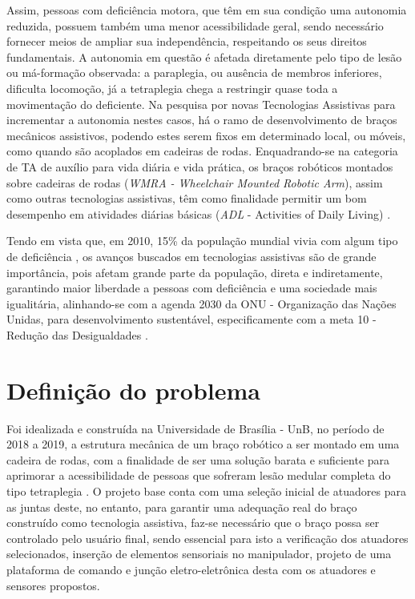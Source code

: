 Assim, pessoas com deficiência motora, que têm em sua condição uma autonomia reduzida, possuem também uma menor acessibilidade geral, sendo necessário fornecer
meios de ampliar sua independência, respeitando os seus direitos fundamentais. A autonomia em questão é afetada diretamente pelo tipo de lesão ou 
má-formação observada: a paraplegia, ou ausência de membros inferiores, dificulta  locomoção, já a tetraplegia chega a restringir quase toda a movimentação do deficiente.
Na pesquisa por novas Tecnologias Assistivas para incrementar a autonomia nestes casos, há o ramo de desenvolvimento de braços mecânicos assistivos, podendo 
estes serem fixos em determinado local, ou móveis, como quando são acoplados em cadeiras de rodas. Enquadrando-se na categoria de TA de auxílio para vida
diária e vida prática, os braços robóticos montados sobre cadeiras de rodas (\textit{WMRA - Wheelchair Mounted Robotic Arm}), assim como outras tecnologias 
assistivas, têm como finalidade permitir um bom desempenho em atividades diárias básicas (\textit{ADL} - Activities of Daily Living) \cite{capille2010kinematic}. 

Tendo em vista que, em 2010, 15\% da população mundial vivia com algum tipo de deficiência \cite{world2011world}, os avanços buscados em tecnologias 
assistivas são de grande importância, pois afetam grande parte da população, direta e indiretamente, 
garantindo maior liberdade a pessoas com deficiência e uma sociedade
mais igualitária, alinhando-se com a agenda 2030 da ONU - Organização das Nações Unidas,
para desenvolvimento sustentável, especificamente com a meta 10 - Redução das Desigualdades \cite{un2030agenda}.

\section{Definição do problema}

Foi idealizada e construída na Universidade de Brasília - UnB, no período de 2018 a 2019, 
a estrutura mecânica de um braço robótico a ser montado em uma cadeira de rodas, com a finalidade de ser
uma solução barata e suficiente para aprimorar a acessibilidade de pessoas que sofreram lesão medular completa do tipo tetraplegia \cite{fernando2019assistivo}. 
O projeto base conta com uma seleção inicial de atuadores para as juntas deste, no entanto, para garantir uma adequação real do braço construído como 
tecnologia assistiva, faz-se necessário que o braço possa ser controlado pelo usuário final, sendo essencial para isto a verificação dos atuadores selecionados, 
inserção de elementos sensoriais no manipulador, projeto de uma plataforma de comando e junção eletro-eletrônica desta com os atuadores e sensores propostos.

